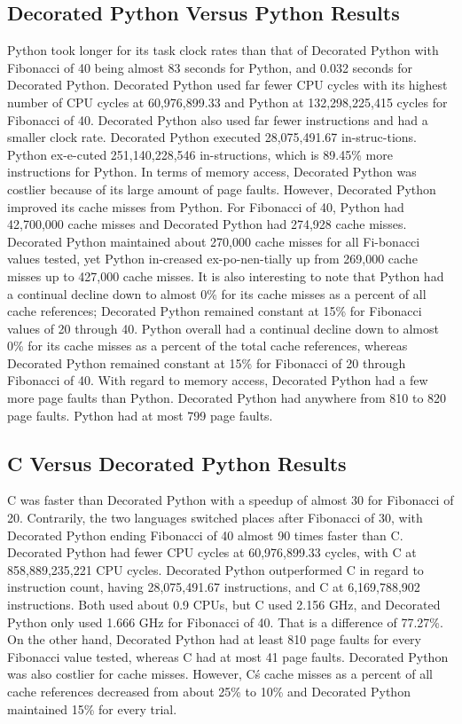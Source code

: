 \documentclass{sig-alternate}
\begin{document}
\subsection{Decorated Python Versus Python Results}
Python took longer for its task clock rates than that of Decorated Python with Fibonacci of 40 being almost 83 seconds for Python, and 0.032 seconds for Decorated Python. Decorated Python used far fewer CPU cycles with its highest number of CPU cycles at 60,976,899.33 and Python at 132,298,225,415 cycles for Fibonacci of 40. Decorated Python also used far fewer instructions and had a smaller clock rate. Decorated Python executed 28,075,491.67 in-struc-tions. Python ex-e-cuted 251,140,228,546 in-structions, which is 89.45\% more instructions for Python. In terms of memory access, Decorated Python was costlier because of its large amount of page faults. However, Decorated Python improved its cache misses from Python. For Fibonacci of 40, Python had 42,700,000 cache misses and Decorated Python had 274,928 cache misses. Decorated Python maintained about 270,000 cache misses for all Fi-bonacci values tested, yet Python in-creased ex-po-nen-tially up from 269,000 cache misses up to 427,000 cache misses. It is also interesting to note that Python had a continual decline down to almost 0\% for its cache misses as a percent of all cache references; Decorated Python remained constant at 15\% for Fibonacci values of 20 through 40. Python overall had a continual decline down to almost 0\% for its cache misses as a percent of the total cache references, whereas Decorated Python remained constant at 15\% for Fibonacci of 20 through Fibonacci of 40. With regard to memory access, Decorated Python had a few more page faults than Python. Decorated Python had anywhere from 810 to 820 page faults. Python had at most 799 page faults.

\subsection{C Versus Decorated Python Results}
C was faster than Decorated Python with a speedup of almost 30 for Fibonacci of 20. Contrarily, the two languages switched places after Fibonacci of 30, with Decorated Python ending Fibonacci of 40 almost 90 times faster than C. Decorated Python had fewer CPU cycles at 60,976,899.33 cycles, with C at 858,889,235,221 CPU cycles. Decorated Python outperformed C in regard to instruction count, having 28,075,491.67 instructions, and C at 6,169,788,902 instructions. Both used about 0.9 CPUs, but C used 2.156 GHz, and Decorated Python only used 1.666 GHz for Fibonacci of 40. That is a difference of 77.27\%. On the other hand, Decorated Python had at least 810 page faults for every Fibonacci value tested, whereas C had at most 41 page faults. Decorated Python was also costlier for cache misses. However, C\'s cache misses as a percent of all cache references decreased from about 25\% to 10\% and Decorated Python maintained 15\% for every trial.
\end{document}
